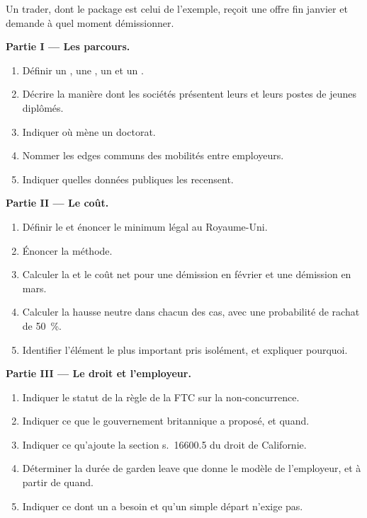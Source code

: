 \begin{problem}\label{pb:in:career-paths-and-moves:1}
Un trader, dont le package est celui de l'exemple, reçoit une offre fin janvier et demande à quel moment démissionner.

\medskip\noindent\textbf{Partie I --- Les parcours.}
\begin{enumerate}
\item Définir un , une , un  et un .
\item Décrire la manière dont les sociétés présentent leurs  et leurs postes de jeunes diplômés.
\item Indiquer où mène un doctorat.
\item Nommer les edges communs des mobilités entre employeurs.
\item Indiquer quelles données publiques les recensent.
\end{enumerate}

\medskip\noindent\textbf{Partie II --- Le coût.}
\begin{enumerate}[resume]
\item Définir le  et énoncer le minimum légal au Royaume-Uni.
\item Énoncer la méthode.
\item Calculer la  et le coût net pour une démission en février et une démission en mars.
\item Calculer la hausse neutre dans chacun des cas, avec une probabilité de rachat de 50~\%.
\item Identifier l'élément le plus important pris isolément, et expliquer pourquoi.
\end{enumerate}

\medskip\noindent\textbf{Partie III --- Le droit et l'employeur.}
\begin{enumerate}[resume]
\item Indiquer le statut de la règle de la FTC sur la non-concurrence.
\item Indiquer ce que le gouvernement britannique a proposé, et quand.
\item Indiquer ce qu'ajoute la section s.~16600.5 du droit de Californie.
\item Déterminer la durée de garden leave que donne le modèle de l'employeur, et à partir de quand.
\item Indiquer ce dont un  a besoin et qu'un simple départ n'exige pas.
\end{enumerate}


\end{problem}
